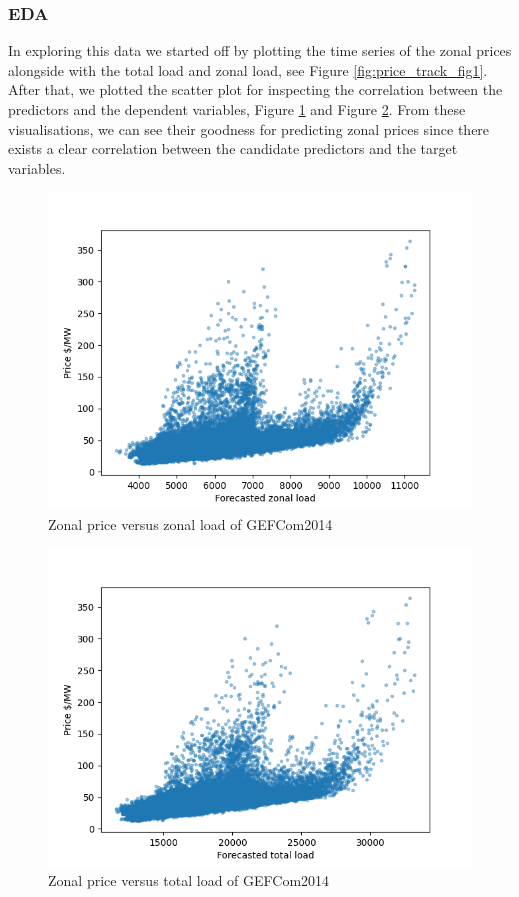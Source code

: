 \subsubsection{EDA}
In exploring this data we started off by plotting the time series of the zonal prices alongside with the total load and zonal load, see Figure \ref{fig:price_track_fig1}.
After that, we plotted the scatter plot for inspecting the correlation between the predictors and the dependent variables, Figure \ref{fig:gefcom_zonal_price_vs_zonal_load} and Figure \ref{fig:gefcom_zonal_price_vs_total_load}. From these visualisations, we can see their goodness for predicting zonal prices since there exists a clear correlation between the candidate predictors and the target variables.

\begin{figure}[!ht]
    \includegraphics[width=\textwidth]{images/gefcom_zonal_price_vs_zonal_load.png}
    \caption{Zonal price versus zonal load of GEFCom2014}
    \label{fig:gefcom_zonal_price_vs_zonal_load}
\end{figure}


\begin{figure}[!ht]
    \includegraphics[width=\textwidth]{images/gefcom_zonal_price_vs_total_load.png}
    \caption{Zonal price versus total load of GEFCom2014}
    \label{fig:gefcom_zonal_price_vs_total_load}
\end{figure}

